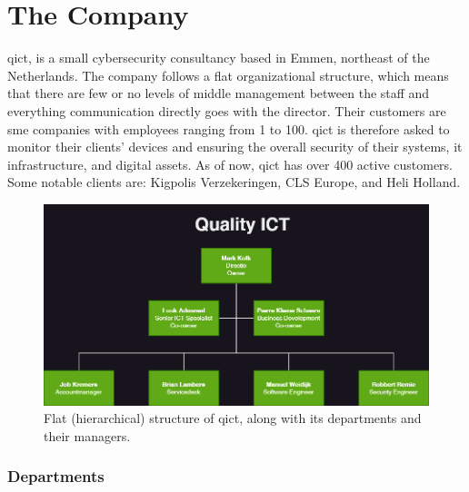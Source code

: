 \section{The Company}

\acrshort{qict}, is a small cybersecurity consultancy based in Emmen, northeast of the Netherlands. The company follows
a flat organizational structure, which means that there are few or no levels of middle management between the staff and
everything communication directly goes with the director. Their customers are \acrshort{sme} companies with employees ranging
from 1 to 100. \acrshort{qict} is therefore asked to monitor their clients' devices and ensuring the overall security of their
systems, \acrshort{it} infrastructure, and digital assets. As of now, \acrshort{qict} has over 400 active customers. Some notable clients
are: Kigpolis Verzekeringen, CLS Europe, and Heli Holland.

\begin{figure}[htbp]
      \centering
      \includegraphics[width=1.0\textwidth]{Figures/OrganizationalDiagram_QICT.png}
      \caption{Flat (hierarchical) structure of \acrshort{qict}, along with its departments and their managers.}
\end{figure}

\subsubsection{Departments}

